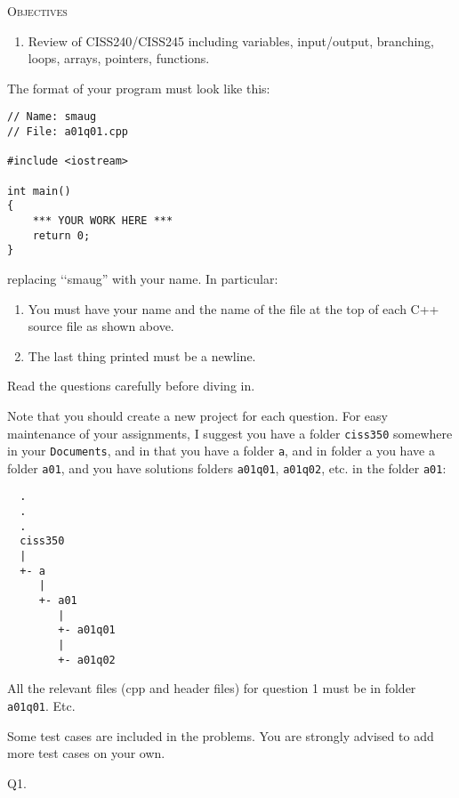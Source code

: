 


\renewcommand\TITLE{Assignment 1}



\topmatter


\textsc{Objectives}
\begin{enumerate}[topsep=0pt]
\item Review of CISS240/CISS245 including variables, input/output, branching, 
loops, arrays, pointers, functions.
\end{enumerate}

The format of your program must look like this:

\begin{Verbatim}[frame=single]
// Name: smaug
// File: a01q01.cpp

#include <iostream>

int main()
{
    *** YOUR WORK HERE ***
    return 0;
}
\end{Verbatim}
replacing \lq\lq smaug'' with your name.
In particular:
\begin{enumerate}
\item You must have your name and the name of the file at the top of each 
C++ source file as shown above.
\item The last thing printed must be a newline.
\end{enumerate}

Read the questions carefully before diving in.

Note that you should create a new project for each question. 
For easy maintenance of your assignments, 
I suggest you have a folder \verb!ciss350! somewhere in your 
\verb!Documents!, 
and in that you have a folder 
\verb!a!, 
and in folder a you have a folder 
\verb!a01!, 
and you have solutions folders 
\verb!a01q01!,
\verb!a01q02!, etc. in the folder 
\verb!a01!:

\begin{verbatim}
  .
  .
  .
  ciss350
  |
  +- a
     |
     +- a01
        |
        +- a01q01
        |
        +- a01q02
\end{verbatim}

All the relevant files (cpp and header files) for question 1 
must be in folder \verb!a01q01!. Etc.

Some test cases are included in the problems.
You are strongly advised to add more test cases on your own.
\newpage


\newpage
Q1.




